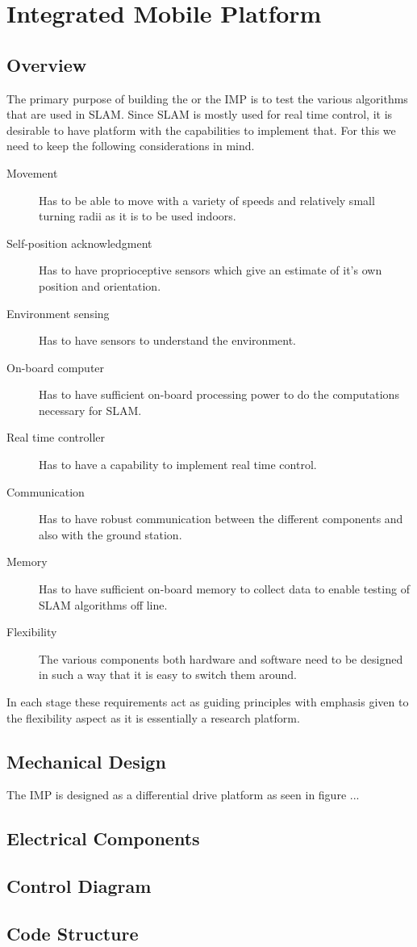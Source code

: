 \chapter{Integrated Mobile Platform}
\label{cha:Platform}
\section{Overview}

The primary purpose of building the \imp or the IMP is to test the various algorithms that are used in SLAM. Since SLAM is mostly used for real time control, it is desirable to have platform with the capabilities to implement that. For this we need to keep the following considerations in mind. 
\begin{description}
	\item[Movement] Has to be able to move with a variety of speeds and relatively small turning radii as it is to be used indoors. 
	\item[Self-position acknowledgment] Has to have proprioceptive sensors which give an estimate of it's own position and orientation.
	\item[Environment sensing] Has to have sensors to understand the environment. 
	\item[On-board computer] Has to have sufficient on-board processing power to do the computations necessary for SLAM.
	\item[Real time controller] Has to have a capability to implement real time control.
	\item[Communication] Has to have robust communication between the different components and also with the ground station. 
	\item[Memory] Has to have sufficient on-board memory to collect data to enable testing of SLAM algorithms off line.  
	\item[Flexibility] The various components both hardware and software need to be designed in such a way that it is easy to switch them around.
\end{description}

In each stage these requirements act as guiding principles with emphasis given to the flexibility aspect as it is essentially a research platform.  
\section{Mechanical Design}

The IMP is designed as a differential drive platform as seen in figure ... 
\section{Electrical Components}
\section{Control Diagram}
\section{Code Structure} 